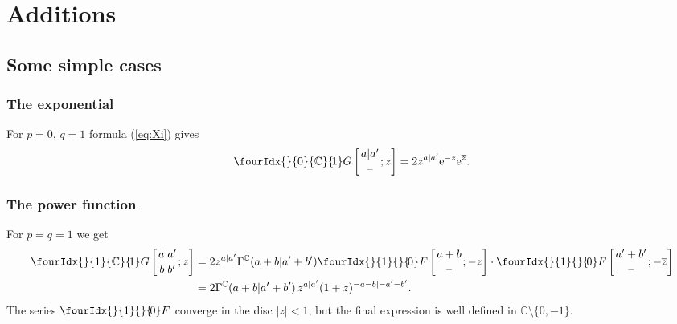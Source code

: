 \documentclass[pdftex]{sigma}
\numberwithin{equation}{section}
\newcommand{\hyp}[2]{\fourIdx{}{#1}{}{\!#2}F}
\newcommand{\Gc}[2]{\fourIdx{}{#1}{\C}{\!#2}G}
\def\ov{\overline}
\def\C {{\mathbb C }}
\begin{document}
\section{Additions}\label{section3}

\subsection{Some simple cases}

\subsubsection{The exponential}
For $p=0$, $q=1$ formula (\ref{eq:Xi}) gives
 \begin{equation}
\Gc{0}{1}\left[\genfrac{}{}{0pt}{}{a|a'}{\text{--}};z\right]
=2 z^{a|a'} {\rm e}^{-z} {\rm e}^{\ov z}.
\label{eq:1G0}
\end{equation}

\subsubsection{The power function}
For $p=q=1$ we get
\begin{align}
\Gc{1}{1}\left[\genfrac{}{}{0pt}{}{a|a'}{b|b'};z\right]
&=2 z^{a|a'} \Gamma^\C(a+b|a'+b')
\hyp{1}{0}\left[\genfrac{}{}{0pt}{}{a+b}{\text{--}};-z\right]
\cdot
\hyp{1}{0}\left[\genfrac{}{}{0pt}{}{a'+b'}{\text{--}};-\ov z\right] \notag\\
&=2\Gamma^\C(a+b|a'+b')\, z^{a|a'} (1+z)^{-a-b|-a'-b'}.\label{eq:1G1}
\end{align}
The series $\hyp{1}{0}$ converge in the disc $|z|<1$, but the final
expression is well defined in $\C\setminus\{0,-1\}$.
\end{document}
